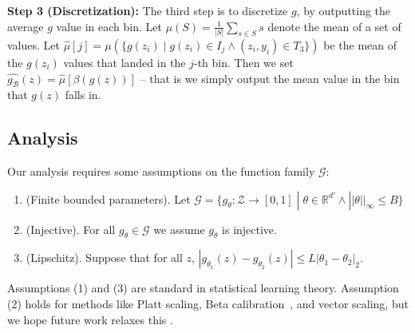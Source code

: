 \textbf{Step 3 (Discretization):} The third step is to discretize $g$, by outputting the average $g$ value in each bin. Let $\mu(S) = \frac{1}{|S|} \sum_{s \in S} s$ denote the mean of a set of values.
Let $\hat{\mu}[j] = \mu(\{ g(z_i) \; | \; g(z_i) \in I_j \wedge (z_i, y_i) \in T_3 \})$ be the mean of the $g(z_i)$ values that landed in the $j$-th bin.
Then we set $\hat{g_{\mathcal{B}}}(z) = \hat{\mu}[\beta(g(z))]$ -- that is we simply output the mean value in the bin that $g(z)$ falls in.


\subsection{Analysis}



Our analysis  requires some assumptions on the function family $\mathcal{G}$:
\begin{enumerate}
\item (Finite bounded parameters). Let $\mathcal{G} = \{ g_{\theta} : \mathcal{Z} \to [0, 1] \; | \; \theta \in \mathbb{R}^{d'} \wedge ||\theta||_{\infty} \leq B \}$
\item (Injective). For all $g_{\theta} \in \mathcal{G}$ we assume $g_{\theta}$ is injective.
\item (Lipschitz). Suppose that for all $z$, $|g_{\theta_1}(z) - g_{\theta_2}(z)| \leq L|\theta_1 - \theta_2|_2$.
\end{enumerate}

Assumptions (1) and (3) are standard in statistical learning theory. Assumption (2)  holds for methods like Platt scaling, Beta calibration~\cite{kull2017sigmoids}, and vector scaling, but we hope future work relaxes this .

